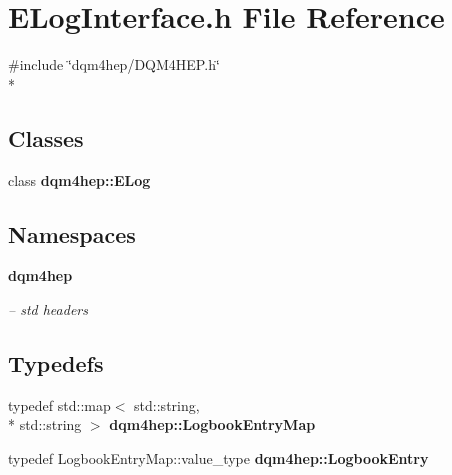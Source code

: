 \section{E\+Log\+Interface.\+h File Reference}
\label{ELogInterface_8h}
{\ttfamily \#include \char`\"{}dqm4hep/\+D\+Q\+M4\+H\+E\+P.\+h\char`\"{}}\\*
\subsection*{Classes}
\begin{DoxyCompactItemize}
\item 
class {\bf dqm4hep\+::\+E\+Log}
\end{DoxyCompactItemize}
\subsection*{Namespaces}
\begin{DoxyCompactItemize}
\item 
 {\bf dqm4hep}
\begin{DoxyCompactList}\small\item\em -- std headers \end{DoxyCompactList}\end{DoxyCompactItemize}
\subsection*{Typedefs}
\begin{DoxyCompactItemize}
\item 
typedef std\+::map$<$ std\+::string, \\*
std\+::string $>$ {\bf dqm4hep\+::\+Logbook\+Entry\+Map}
\item 
typedef Logbook\+Entry\+Map\+::value\+\_\+type {\bf dqm4hep\+::\+Logbook\+Entry}
\end{DoxyCompactItemize}
